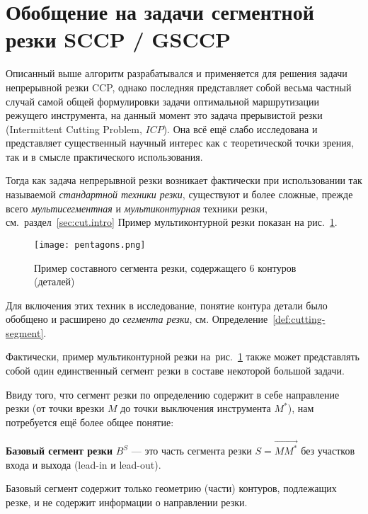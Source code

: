 
\section{Обобщение на задачи сегментной резки SCCP / GSCCP}
\label{sec:ccp.gsccp}

Описанный выше алгоритм разрабатывался и применяется
для решения задачи непрерывной резки CCP,
однако последняя представляет собой весьма
частный случай самой общей формулировки
задачи оптимальной маршрутизации режущего инструмента,
на данный момент это задача прерывистой резки
(Intermittent Cutting Problem, $ICP$).
Она всё ещё слабо исследована
и представляет существенный научный интерес
как с теоретической точки зрения,
так и в смысле практического использования.

Тогда как задача непрерывной резки возникает фактически
при использовании так называемой
\textit{стандартной техники резки},
существуют и более сложные,
прежде всего
\textit{мультисегментная}
и
\textit{мультиконтурная}
техники резки,
см.~раздел~\ref{sec:cut.intro}
Пример мультиконтурной резки
показан на рис.~\ref{fig:ccp-6x5}.

\begin{figure}
  \centering
  \texttt{[image: pentagons.png]}
  \caption{Пример составного сегмента резки, содержащего 6 контуров (деталей)}
  \label{fig:ccp-6x5}
\end{figure}

Для включения этих техник в исследование,
понятие контура детали было обобщено
\cite{bib:petunin-2019}
и расширено до
\textit{сегмента резки},
см. Определение~\ref{def:cutting-segment}.

Фактически, пример мультиконтурной резки на~рис.~\ref{fig:ccp-6x5}
также может представлять собой один единственный
сегмент резки в составе некоторой большой задачи.

Ввиду того,
что сегмент резки по определению содержит в себе
направление резки
(от точки врезки $M$ до точки выключения инструмента $M^*$),
нам потребуется ещё более общее понятие:

\begin{opred}
  \textbf{Базовый сегмент резки}
  $B^S$
  ---
  это часть сегмента резки
  $S = \overrightarrow{M M^*}$
  без участков входа и выхода
  (lead-in и lead-out).
\end{opred}

Базовый сегмент содержит только геометрию
(части) контуров, подлежащих резке,
и не содержит информации о направлении резки.

